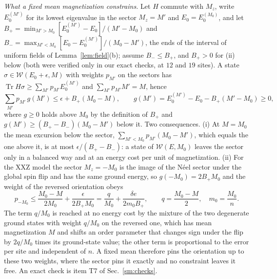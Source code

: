 \documentclass[aps,prx,onecolumn,10pt,nofootinbib,longbibliography,floatfix]{revtex4-2}
\theoremstyle{remark}
\newcommand{\de}{\delta e}
\newcommand{\W}{\mathcal{W}}
\newcommand{\Tr}{\operatorname{Tr}}
\begin{document}
\emph{What a fixed mean magnetization constrains.} Let $H$ commute with $M_z$, write $E_0^{(M')}$ for its lowest
eigenvalue in the sector $M_z=M'$ and $E_0=E_0^{(M_0)}$, and let
$B_+=\min_{M'>M_0}[E_0^{(M')}-E_0]/(M'-M_0)$ and $B_-=\max_{M'<M_0}[E_0-E_0^{(M')}]/(M_0-M')$, the ends of the
interval of uniform fields of Lemma~\ref{lem:field}(b); assume $B_-\le B_+$, and $B_+>0$ for (ii) below (both were
verified only in our exact checks, at $12$ and $19$ sites). A state $\sigma\in\W(E_0+\epsilon,M)$ %
with weights $p_{M'}$ on the sectors has $\Tr H\sigma\ge\sum_{M'}p_{M'}E_0^{(M')}$ and $\sum_{M'}p_{M'}M'=M$, hence
\begin{equation}
\sum_{M'}p_{M'}\,g(M')\le\epsilon+B_+(M_0-M),\qquad g(M')=E_0^{(M')}-E_0-B_+(M'-M_0)\ge0 , %
\label{eq:meanweights}
\end{equation}
where $g\ge0$ holds above $M_0$ by the definition of $B_+$ and $g(M')\ge(B_+-B_-)(M_0-M')$ below it. Two
consequences. (i) At $M=M_0$ the mean excursion below the sector, $\sum_{M'<M_0}p_{M'}(M_0-M')$, which equals the one
above it, is at most $\epsilon/(B_+-B_-)$: a state of $\W(E,M_0)$ leaves the sector only in a balanced way and at an
energy cost per unit of magnetization. (ii) For the XXZ model the sector $M_z=-M_0$ is the image of the N\'eel
sector under the global spin flip and has the same ground energy, so $g(-M_0)=2B_+M_0$ and the weight of the
reversed orientation obeys
\begin{equation}
p_{-M_0}\le\frac{M_0-M}{2M_0}+\frac{\epsilon}{2B_+M_0}=\frac{q}{M_0}+\frac{\de}{2m_0B_+},\qquad q=\frac{M_0-M}{2},\quad m_0=\frac{M_0}{n} . %
\label{eq:mirrorweight}
\end{equation}
The term $q/M_0$ is reached at no energy cost by the mixture of the two degenerate ground states with weight
$q/M_0$ on the reversed one, which has mean magnetization $M$ and shifts an order parameter that changes sign under
the flip by $2q/M_0$ times its ground-state value; the other term is proportional to the error per site and
independent of $n$. A fixed mean therefore pins the orientation up to these two weights, where the sector pins it
exactly and no constraint leaves it free. An exact check is item T7 of Sec.~\ref{sm:checks}. %
\end{document}
